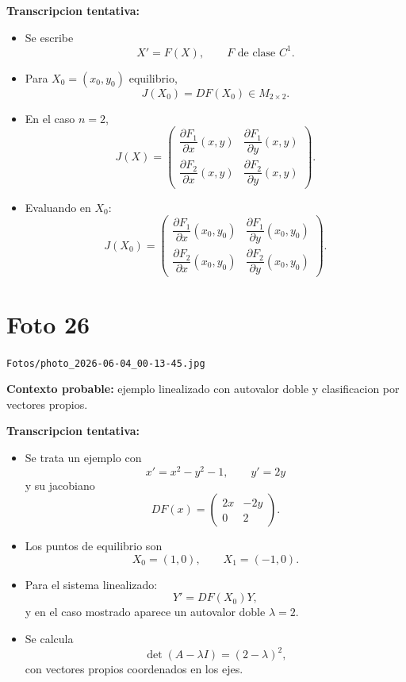 \documentclass[11pt,letterpaper]{article}
\begin{document}
\textbf{Transcripcion tentativa:}
\begin{itemize}[leftmargin=*]
    \item Se escribe
    \[
    X'=F(X), \qquad F \text{ de clase } C^1.
    \]
    \item Para \(X_0=(x_0,y_0)\) equilibrio,
    \[
    J(X_0)=DF(X_0)\in M_{2\times 2}.
    \]
    \item En el caso \(n=2\),
    \[
    J(X)=
    \begin{pmatrix}
    \dfrac{\partial F_1}{\partial x}(x,y) & \dfrac{\partial F_1}{\partial y}(x,y)\\[6pt]
    \dfrac{\partial F_2}{\partial x}(x,y) & \dfrac{\partial F_2}{\partial y}(x,y)
    \end{pmatrix}.
    \]
    \item Evaluando en \(X_0\):
    \[
    J(X_0)=
    \begin{pmatrix}
    \dfrac{\partial F_1}{\partial x}(x_0,y_0) & \dfrac{\partial F_1}{\partial y}(x_0,y_0)\\[6pt]
    \dfrac{\partial F_2}{\partial x}(x_0,y_0) & \dfrac{\partial F_2}{\partial y}(x_0,y_0)
    \end{pmatrix}.
    \]
\end{itemize}

\section*{Foto 26}
\texttt{Fotos/photo\_2026-06-04\_00-13-45.jpg}

\textbf{Contexto probable:} ejemplo linealizado con autovalor doble y clasificacion por vectores propios.

\textbf{Transcripcion tentativa:}
\begin{itemize}[leftmargin=*]
    \item Se trata un ejemplo con
    \[
    x'=x^2-y^2-1,\qquad y'=2y
    \]
    y su jacobiano
    \[
    DF(x)=
    \begin{pmatrix}
    2x & -2y\\
    0 & 2
    \end{pmatrix}.
    \]
    \item Los puntos de equilibrio son
    \[
    X_0=(1,0),\qquad X_1=(-1,0).
    \]
    \item Para el sistema linealizado:
    \[
    Y'=DF(X_0)Y,
    \]
    y en el caso mostrado aparece un autovalor doble \(\lambda=2\).
    \item Se calcula
    \[
    \det(A-\lambda I)=(2-\lambda)^2,
    \]
    con vectores propios coordenados en los ejes.
\end{itemize}
\end{document}
